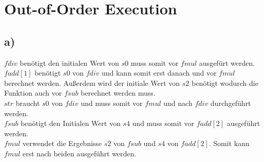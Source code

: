 \documentclass[a4paper,12pt,headsepline]{scrartcl}
\newcommand{\Ex}[2]
{
	\setcounter{section}{#2}
	\section*{Übungsblatt #2 zu #1}
}
\begin{document}
\section{Out-of-Order Execution}
\subsection*{a)}
$fdiv$ benötigt den initialen Wert von $s0$ muss somit vor $fmul$ ausgefürt werden.\\
$fadd[1]$ benötigt $s0$ von $fdiv$ und kann somit erst danach und vor $fmul$ berechnet werden. Außerdem wird der initiale Wert von $s2$ benötigt wodurch die Funktion auch vor $fsub$ berechnet werden muss.\\
$str$ braucht $s0$ von $fdiv$ und muss somit vor $fmul$ und nach $fdiv$ durchgeführt werden.\\
$fsub$ benötigt den Initialen Wert von $s4$ und muss somit vor $fadd[2]$ ausgeführt werden.\\
$fmul$ verwendet die Ergebnisse $s2$ von $fsub$ und $s4$ von $fadd[2]$. Somit kann $fmul$ erst nach beiden ausgeführt werden.
\\
\end{document}
